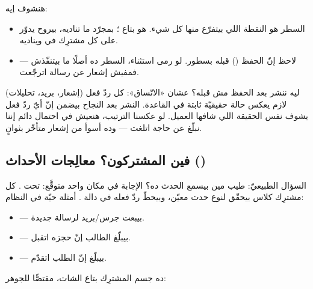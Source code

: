 هنشوف إيه:
\begin{itemize}
\item السطر  هو النقطة
  اللي بيتفرّع منها كل شيء.  هو  بتاع
  ؛ بمجرّد ما تناديه،  بيروح يدوّر على كل مشترِك في
   ويناديه.
\item لاحظ إنّ الحفظ () قبله بسطور. لو رمى استثناء، السطر
  ده أصلًا ما بيتنفّذش — فمفيش إشعار عن رسالة اترجّعت.
\end{itemize}

\begin{why}
ليه ننشر بعد الحفظ مش قبله؟ عشان «الاتّساق»: كل ردّ فعل (إشعار، بريد، تحليلات)
لازم يعكس حالة حقيقيّة ثابتة في القاعدة. النشر بعد النجاح بيضمن إنّ أيّ ردّ
فعل يشوف نفس الحقيقة اللي شافها العميل. لو عكسنا الترتيب، هنعيش في احتمال دائم إننا
نبلّغ عن حاجة اتلغت — وده أسوأ من إشعار متأخّر بثوانٍ.
\end{why}

\subsection{فين المشتركون؟ معالِجات الأحداث ()}

السؤال الطبيعيّ: طيب مين بيسمع الحدث ده؟ الإجابة في مكان واحد متوقَّع: تحت
. كل مشترِك كلاس بيحقّق 
لنوع حدث معيّن، وبيحطّ ردّ فعله في دالة . أمثلة حيّة في النظام:

\begin{itemize}
\item {} — بيبعت جرس/بريد لرسالة جديدة.
\item {} — بيبلّغ الطالب إنّ حجزه اتقبل.
\item {} — بيبلّغ إنّ الطلب اتقدّم.
\end{itemize}

ده جسم المشترِك بتاع الشات، مقتصًّا للجوهر:

